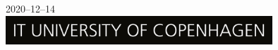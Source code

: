 \begin{titlepage}

{\large 2020--12--14}\\[1cm] %


\includegraphics[width=10cm]{img/logo}\\[1cm] %


\vfill %

\end{titlepage}